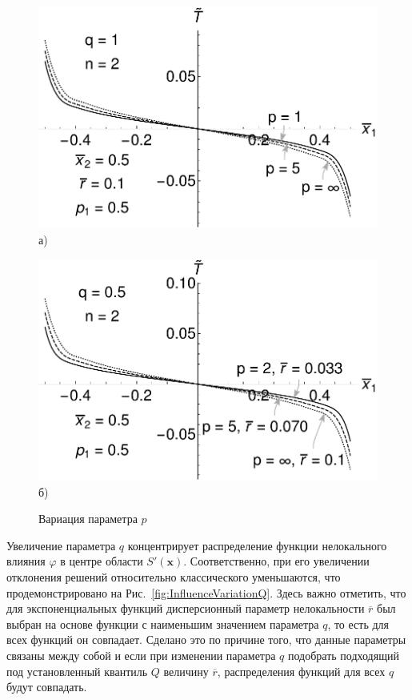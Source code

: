 \begin{figure}[ht]
    \begin{minipage}[b][][b]{0.49\linewidth}\centering
        \includegraphics[width=\linewidth]{pics/TPolyInfluenceVariationP.pdf} \\ а)
    \end{minipage}
    \hfill
    \begin{minipage}[b][][b]{0.49\linewidth}\centering
        \includegraphics[width=\linewidth]{pics/TExpInfluenceVariationP.pdf} \\ б)
    \end{minipage}
    \caption{Вариация параметра $p$}
    \label{fig:InfluenceVariationP}
\end{figure}

Увеличение параметра $q$ концентрирует распределение функции нелокального влияния $\varphi$ в центре области $S'(\boldsymbol{x})$. Соответственно, при его увеличении отклонения решений относительно классического уменьшаются, что продемонстрировано на Рис.~\ref{fig:InfluenceVariationQ}. Здесь важно отметить, что для экспоненциальных функций дисперсионный параметр нелокальности $\overline{r}$ был выбран на основе функции с наименьшим значением параметра $q$, то есть для всех функций он совпадает. Сделано это по причине того, что данные параметры связаны между собой и если при изменении параметра $q$ подобрать подходящий под установленный квантиль $Q$ величину $\overline{r}$, распределения функций для всех $q$ будут совпадать.

